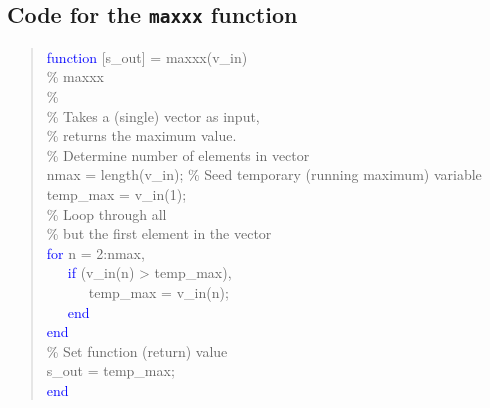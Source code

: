 \documentclass{tufte-book} %
\newenvironment{docspec}{\begin{quotation}\ttfamily\parskip0pt\parindent0pt\ignorespaces}{\end{quotation}}
\begin{document}
\subsection*{Code for the \texttt{maxxx} function}

\begin{docspec}
\textcolor{blue}{function} [s\_out] = maxxx(v\_in)\\
\textcolor[rgb]{0,0.501961,0}{\% maxxx\\
\%\\
\% Takes a (single) vector as input, \\ \% returns the maximum value.}\\

\textcolor[rgb]{0,0.501961,0}{\% Determine number of elements in vector}\\
nmax = length(v\_in);
\textcolor[rgb]{0,0.501961,0}{\% Seed temporary (running maximum) variable}\\
temp\_max = v\_in(1);\\
\textcolor[rgb]{0,0.501961,0}{\% Loop through all \\ \% but the first element in the vector}\\
\textcolor{blue}{for} n = 2:nmax,\\
\ \ \ \textcolor{blue}{if} (v\_in(n) > temp\_max),\\
\ \ \ \ \ \ temp\_max = v\_in(n);\\
\ \ \ \textcolor{blue}{end}\\
\textcolor{blue}{end}\\
\textcolor[rgb]{0,0.501961,0}{\% Set function (return) value}\\
s\_out = temp\_max;\\
\textcolor{blue}{end}
\end{docspec}


\backmatter




\printindex %
\end{document}
